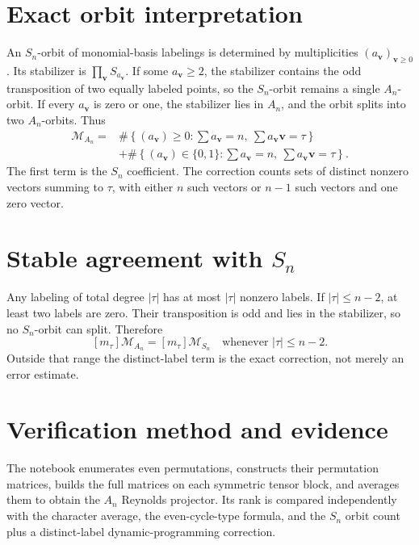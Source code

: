 \documentclass[10pt]{article}
\newcommand{\M}{\mathcal M}
\begin{document}
\section{Exact orbit interpretation}
An $S_n$-orbit of monomial-basis labelings is determined by multiplicities
$(a_{\mathbf v})_{\mathbf v\ge0}$.  Its stabilizer is
$\prod_{\mathbf v}S_{a_{\mathbf v}}$.  If some $a_{\mathbf v}\ge2$, the
stabilizer contains the odd transposition of two equally labeled points, so the
$S_n$-orbit remains a single $A_n$-orbit.  If every $a_{\mathbf v}$ is zero or
one, the stabilizer lies in $A_n$, and the orbit splits into two $A_n$-orbits.
Thus
\begin{align*}
[m_\tau]\M_{A_n}
={}&\#\left\{(a_{\mathbf v})\ge0:\sum a_{\mathbf v}=n,\ 
 \sum a_{\mathbf v}\mathbf v=\tau\right\}\\
&+\#\left\{(a_{\mathbf v})\in\{0,1\}:\sum a_{\mathbf v}=n,\ 
 \sum a_{\mathbf v}\mathbf v=\tau\right\}.
\end{align*}
The first term is the $S_n$ coefficient.  The correction counts sets of
distinct nonzero vectors summing to $\tau$, with either $n$ such vectors or
$n-1$ such vectors and one zero vector.

\section{Stable agreement with \texorpdfstring{$S_n$}{S-n}}
Any labeling of total degree $|\tau|$ has at most $|\tau|$ nonzero labels.  If
$|\tau|\le n-2$, at least two labels are zero.  Their transposition is odd and
lies in the stabilizer, so no $S_n$-orbit can split.  Therefore
\[
 \boxed{[m_\tau]\M_{A_n}=[m_\tau]\M_{S_n}
 \quad\text{whenever }|\tau|\le n-2.}
\]
Outside that range the distinct-label term is the exact correction, not merely
an error estimate.

\section{Verification method and evidence}
The notebook enumerates even permutations, constructs their permutation
matrices, builds the full matrices on each symmetric tensor block, and averages
them to obtain the $A_n$ Reynolds projector.  Its rank is compared independently
with the character average, the even-cycle-type formula, and the $S_n$ orbit
count plus a distinct-label dynamic-programming correction.
\end{document}
